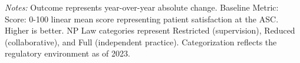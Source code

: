 \begin{table}[htbp]
    \centering
    \caption{Summary of Change in Overall OAS CAHPS Score by Authority and Year}
    \label{tab:d_oas_100_score}
    \vspace{0.2cm}
    \vspace{0.1cm}
    \begin{minipage}{\textwidth}
        \footnotesize \textit{Notes:} Outcome represents year-over-year absolute change. Baseline Metric: Score: 0-100 linear mean score representing patient satisfaction at the ASC. Higher is better. NP Law categories represent Restricted (supervision), Reduced (collaborative), and Full (independent practice). Categorization reflects the regulatory environment as of 2023.
    \end{minipage}
\end{table}